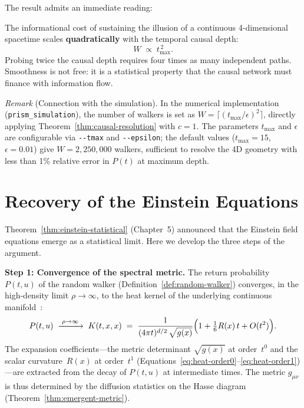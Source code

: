 \noindent
The result admits an immediate reading:

\begin{result}[title={The Price of Smoothness}]
\label{res:price-of-smoothness}
The informational cost of sustaining the illusion of a continuous
4-dimensional spacetime scales \textbf{quadratically} with the
temporal causal depth:
\[
  W \;\propto\; t_{\max}^{\,2}.
\]
Probing twice the causal depth requires four times as many independent
paths. Smoothness is not free: it is a statistical property that the
causal network must finance with information flow.
\end{result}

\noindent\textit{Remark} (Connection with the simulation).
In the numerical implementation (\texttt{prism\_simulation}), the
number of walkers is set as
$W = \lceil(t_{\max}/\epsilon)^2\rceil$, directly applying
Theorem~\ref{thm:causal-resolution} with $c = 1$. The parameters
$t_{\max}$ and $\epsilon$ are configurable via \texttt{-{}-tmax} and
\texttt{-{}-epsilon}; the default values ($t_{\max}=15$,
$\epsilon=0{.}01$) give $W = 2{,}250{,}000$ walkers, sufficient to
resolve the 4D geometry with less than 1\% relative error in $P(t)$
at maximum depth.

\medskip

\section{Recovery of the Einstein Equations}

Theorem~\ref{thm:einstein-statistical} (Chapter~5) announced that the
Einstein field equations emerge as a statistical limit. Here we
develop the three steps of the argument.

\medskip
\noindent\textbf{Step 1: Convergence of the spectral metric.}
The return probability $P(t,u)$ of the random walker
(Definition~\ref{def:random-walker}) converges, in the high-density
limit $\rho \to \infty$, to the heat kernel of the underlying
continuous
manifold~\cite{benincasa2010,dowker2013}:
\[
  P(t,u) \;\xrightarrow{\;\rho\to\infty\;}
  \; K(t,x,x)
  \;=\; \frac{1}{(4\pi t)^{d/2}\,\sqrt{g(x)}}
  \Bigl(1 + \tfrac{1}{6}R(x)\,t + O(t^2)\Bigr).
\]
The expansion coefficients---the metric determinant $\sqrt{g(x)}$ at
order~$t^0$ and the scalar curvature~$R(x)$ at order~$t^1$
(Equations~\eqref{eq:heat-order0}--\eqref{eq:heat-order1})---are
extracted from the decay of $P(t,u)$ at intermediate times. The
metric $g_{\mu\nu}$ is thus determined by the diffusion statistics on
the Hasse diagram (Theorem~\ref{thm:emergent-metric}).


